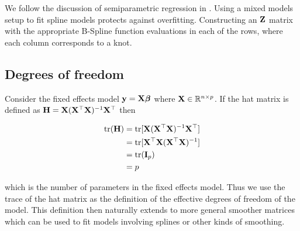 \documentclass{amsart}[12pt]
\begin{document}
We follow the discussion of semiparametric regression in \cite{RuppertWandCarroll}.
Using a mixed models setup to fit spline models protects against overfitting.
Constructing an ${\bf Z}$ matrix with the appropriate B-Spline function evaluations in each of the rows, where
each column corresponds to a knot.

\subsection{Degrees of freedom}


Consider the fixed effects model ${\bf y} = {\bf X} {\boldsymbol \beta}$ where ${\bf X} \in {\mathbb{R}}^{n \times p}$. If the hat matrix is
defined as ${\bf H} = {\bf X} ({\bf X}^\top{\bf X})^{-1} {\bf X}^\top$ then

\begin{align*}
	\text{tr}({\bf H}) & = \text{tr}[{\bf X}({\bf X}^\top{\bf X})^{-1}{\bf X}^\top]  \\
	         & = \text{tr}[{\bf X}^\top{\bf X} ({\bf X}^\top{\bf X})^{-1}] \\
	         & = \text{tr}({\bf I}_p)                          \\
	         & = p                                   
\end{align*}

which is the number of parameters in the fixed effects model. Thus we use the trace of the hat matrix as
the definition of the effective degrees of freedom of the model. This definition then naturally extends to
more general smoother matrices which can be used to fit models involving splines or other kinds of smoothing.


% 

\end{document}
